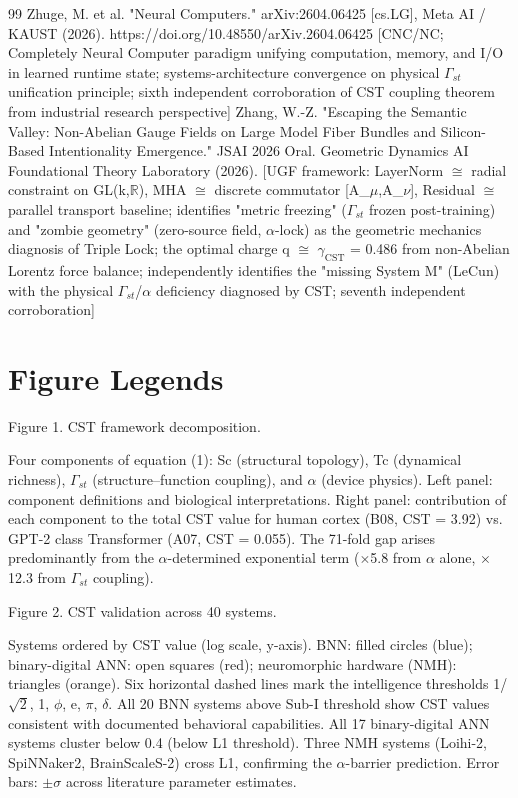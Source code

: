 \documentclass[a4paper,12pt]{article}
\begin{document}
\begin{thebibliography}{99}
 Zhuge, M. et al. "Neural Computers." arXiv:2604.06425 [cs.LG], Meta AI / KAUST (2026). https://doi.org/10.48550/arXiv.2604.06425 [CNC/NC; Completely Neural Computer paradigm unifying computation, memory, and I/O in learned runtime state; systems-architecture convergence on physical $\Gamma_{st}$ unification principle; sixth independent corroboration of CST coupling theorem from industrial research perspective]
 Zhang, W.-Z. "Escaping the Semantic Valley: Non-Abelian Gauge Fields on Large Model Fiber Bundles and Silicon-Based Intentionality Emergence." JSAI 2026 Oral.
Geometric Dynamics AI Foundational Theory Laboratory (2026). [UGF framework: LayerNorm $\cong$ radial constraint on GL(k,$\mathbb{R}$), MHA $\cong$ discrete commutator [A_$\mu$,A_$\nu$], Residual $\cong$ parallel transport baseline; identifies "metric freezing" ($\Gamma_{st}$ frozen post-training) and "zombie geometry" (zero-source field, $\alpha$-lock) as the geometric mechanics diagnosis of Triple Lock; the optimal charge q
$\cong$ $\gamma_{\text{CST}}$ = 0.486 from non-Abelian Lorentz force balance; independently identifies the "missing System M" (LeCun) with the physical $\Gamma_{st}$/$\alpha$ deficiency diagnosed by CST; seventh independent corroboration]
\end{thebibliography}

\section*{Figure Legends}
Figure 1. CST framework decomposition.

Four components of equation (1): Sc (structural topology), Tc (dynamical richness), $\Gamma_{st}$ (structure--function coupling), and $\alpha$ (device physics).
Left panel: component definitions and biological interpretations.
Right panel: contribution of each component to the total CST value for human cortex (B08, CST = 3.92) vs.
GPT-2 class Transformer (A07, CST = 0.055).
The 71-fold gap arises predominantly from the $\alpha$-determined exponential term ($\times$5.8 from $\alpha$ alone, $\times$12.3 from $\Gamma_{st}$ coupling).

Figure 2. CST validation across 40 systems.

Systems ordered by CST value (log scale, y-axis).
BNN: filled circles (blue); binary-digital ANN: open squares (red); neuromorphic hardware (NMH): triangles (orange).
Six horizontal dashed lines mark the intelligence thresholds {1/$\sqrt{2}$, 1, $\phi$, e, $\pi$, $\delta$}.
All 20 BNN systems above Sub-I threshold show CST values consistent with documented behavioral capabilities.
All 17 binary-digital ANN systems cluster below 0.4 (below L1 threshold).
Three NMH systems (Loihi-2, SpiNNaker2, BrainScaleS-2) cross L1, confirming the $\alpha$-barrier prediction.
Error bars: $\pm$$\sigma$ across literature parameter estimates.
\end{document}

